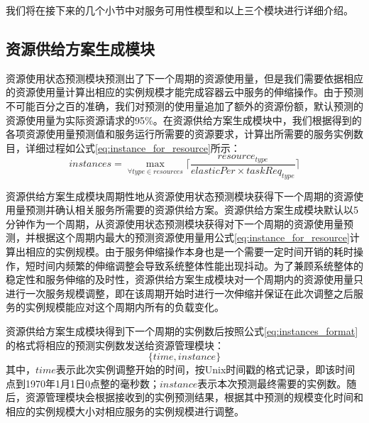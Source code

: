 我们将在接下来的几个小节中对服务可用性模型和以上三个模块进行详细介绍。

\subsection{资源供给方案生成模块}\label{sec:provision_active}
资源使用状态预测模块预测出了下一个周期的资源使用量，但是我们需要依据相应的资源使用量计算出相应的实例规模才能完成容器云中服务的伸缩操作。由于预测不可能百分之百的准确，我们对预测的使用量追加了额外的资源份额，默认预测的资源使用量为实际资源请求的95\%。在资源供给方案生成模块中，我们根据得到的各项资源使用量预测值和服务运行所需要的资源要求，计算出所需要的服务实例数目，详细过程如公式\ref{eq:instance_for_resource}所示：
\begin{equation}\label{eq:instance_for_resource}
instances = \max_{\forall type \in resources} {\lceil \frac{resource_{type}}{{elasticPer} \times {taskReq_{type}}} \rceil}
\end{equation}

资源供给方案生成模块周期性地从资源使用状态预测模块获得下一个周期的资源使用量预测并确认相关服务所需要的资源供给方案。资源供给方案生成模块默认以5分钟作为一个周期，从资源使用状态预测模块获得对下一个周期的资源使用量预测，并根据这个周期内最大的预测资源使用量用公式\ref{eq:instance_for_resource}计算出相应的实例规模。由于服务伸缩操作本身也是一个需要一定时间开销的耗时操作，短时间内频繁的伸缩调整会导致系统整体性能出现抖动。为了兼顾系统整体的稳定性和服务伸缩的及时性，资源供给方案生成模块对一个周期内的资源使用量只进行一次服务规模调整，即在该周期开始时进行一次伸缩并保证在此次调整之后服务的实例规模能应对这个周期内所有的负载变化。

资源供给方案生成模块得到下一个周期的实例数后按照公式\ref{eq:instances_format}的格式将相应的预测实例数发送给资源管理模块：
\begin{equation}\label{eq:instances_format}
\{time, instance\}
\end{equation}
其中，$time$表示此次实例调整开始的时间，按Unix时间戳的格式记录，即该时间点到1970年1月1日0点整的毫秒数；$instance$表示本次预测最终需要的实例数。随后，资源管理模块会根据接收到的实例预测结果，根据其中预测的规模变化时间和相应的实例规模大小对相应服务的实例规模进行调整。

